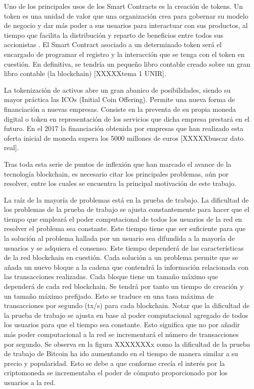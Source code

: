 Uno de los principales usos de los Smart Contracts es la creación de tokens. Un token es una unidad de valor que una organización crea para gobernar su modelo de negocio y dar más poder a sus usuarios para interactuar con sus productos, al tiempo que facilita la distribución y reparto de beneficios entre todos sus accionistas \cite{business}. El Smart Contract asociado a un determinado token será el encargado de programar el registro y la interacción que se tenga con el token en cuestión. En definitiva, se tendría un pequeño libro contable creado sobre un gran libro contable (la blockchain) [XXXXXtema 1 UNIR]. \newline

La tokenización de activos abre un gran abanico de posibilidades, siendo su mayor práctica las ICOs (Initial Coin Offering). Permite una nueva forma de financiación a nuevas empresas. Consiste en la preventa de su propia moneda digital o token en representación de los servicios que dicha empresa prestará en el futuro. En el 2017 la financiación obtenida por empresas que han realizado esta oferta inicial de moneda supera los 5000 millones de euros [XXXXXbuscar dato real]. \newline

Tras toda esta serie de puntos de inflexión que han marcado el avance de la tecnología blockchain, es necesario citar los principales problemas, aún por resolver, entre los cuales se encuentra la principal motivación de este trabajo. \newline

La raíz de la mayoría de problemas está en la prueba de trabajo. La dificultad de los problemas de la prueba de trabajo se ajusta constantemente para hacer que el tiempo que empleará el poder computacional de todos los usuarios de la red en resolver el problema sea constante. Este tiempo tiene que ser suficiente para que la solución al problema hallada por un usuario sea difundida a la mayoría de usuarios y se adquiera el consenso. Este tiempo dependerá de las características de la red blockchain en cuestión. Cada solución a un problema permite que se añada un nuevo bloque a la cadena que contendrá la información relacionada con las transacciones realizadas. Cada bloque tiene un tamaño máximo que dependerá de cada red blockchain. Se tendrá por tanto un tiempo de creación y un tamaño máximo prefijado. Esto se traduce en una tasa máxima de transacciones por segundo (tx/s) para cada blockchain. Notar que la dificultad de la prueba de trabajo se ajusta en base al poder computacional agregado de todos los usuarios para que el tiempo sea constante. Esto significa que no por añadir más poder computacional a la red se incrementará el número de transacciones por segundo. Se observa en la figura XXXXXXXx como la dificultad de la prueba de trabajo de Bitcoin ha ido aumentando en el tiempo de manera similar a su precio y popularidad. Esto se debe a que conforme crecía el interés por la criptomoneda se incrementaba el poder de cómputo proporcionado por los usuarios a la red.\newline

